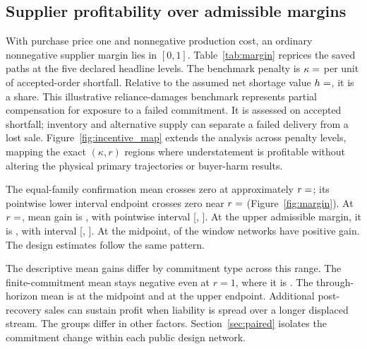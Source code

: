 \documentclass[preprint,11pt,authoryear]{elsarticle}
\begin{document}
\subsection{Supplier profitability over admissible margins}\label{sec:margin}
With purchase price one and nonnegative production cost, an ordinary nonnegative supplier margin lies in $[0,1]$. Table~\ref{tab:margin} reprices the saved paths at the five declared headline levels. The benchmark penalty is $\kappa=\pc{kappa}$ per unit of accepted-order shortfall. Relative to the assumed net shortage value $h=\pc{h}$, it is a  share. This illustrative reliance-damages benchmark represents partial compensation for exposure to a failed commitment. It is assessed on accepted shortfall; inventory and alternative supply can separate a failed delivery from a lost sale. Figure~\ref{fig:incentive_map} extends the analysis across penalty levels, mapping the exact $(\kappa,r)$ regions where understatement is profitable without altering the physical primary trajectories or buyer-harm results.

The equal-family confirmation mean crosses zero at approximately $r=\mg{confirmationMeanRoot}$; its pointwise lower interval endpoint crosses zero near $r=\mg{confirmationLowerRoot}$ (Figure~\ref{fig:margin}). At $r=\mg{r2}$, mean gain is , with pointwise interval [, ]. At the upper admissible margin, it is , with interval [, ]. At the midpoint,  of the  window networks have positive gain. The design estimates follow the same pattern.

The descriptive mean gains differ by commitment type across this range. The finite-commitment mean stays negative even at $r=1$, where it is . The through-horizon mean is  at the midpoint and  at the upper endpoint. Additional post-recovery sales can sustain profit when liability is spread over a longer displaced stream. The groups differ in other factors. Section~\ref{sec:paired} isolates the commitment change within each public design network.
\end{document}

